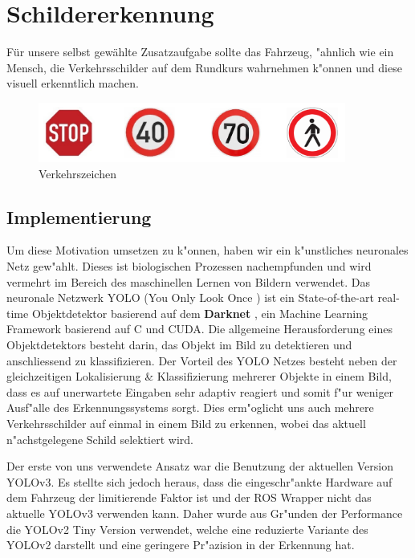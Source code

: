 \section{Schildererkennung}
\label{sec:schildererkennung}

F\"ur unsere selbst gew\"ahlte Zusatzaufgabe sollte das Fahrzeug, "ahnlich wie ein Mensch, die Verkehrsschilder auf dem Rundkurs wahrnehmen k"onnen und diese visuell erkenntlich machen.

\begin{figure}[h]
	\centering
	\includegraphics[width=0.9\textwidth]{images/Verkehrszeichen}
	\caption{Verkehrszeichen}
	\label{fig:verkehrszeichen}
\end{figure}

\subsection{Implementierung}
Um diese Motivation umsetzen zu k"onnen, haben wir ein k"unstliches neuronales Netz gew"ahlt. Dieses ist biologischen Prozessen nachempfunden und wird vermehrt im Bereich des maschinellen Lernen von Bildern verwendet. Das neuronale Netzwerk YOLO (You Only Look Once \cite{darknet13}) ist ein State-of-the-art real-time Objektdetektor
basierend auf dem \textbf{Darknet} , ein Machine Learning Framework basierend auf C und CUDA.
Die allgemeine Herausforderung eines Objektdetektors besteht darin, das Objekt im Bild zu detektieren und anschliessend zu klassifizieren. Der Vorteil des YOLO Netzes besteht neben der gleichzeitigen Lokalisierung \& Klassifizierung mehrerer Objekte in einem Bild, dass es auf unerwartete Eingaben sehr adaptiv reagiert und somit f"ur weniger Ausf"alle des Erkennungssystems sorgt. Dies erm"oglicht uns auch mehrere Verkehrsschilder auf einmal in einem Bild zu erkennen, wobei das aktuell n"achstgelegene Schild selektiert wird.

Der erste von uns verwendete Ansatz war die Benutzung der aktuellen Version YOLOv3. Es stellte sich jedoch heraus, dass die eingeschr"ankte Hardware auf dem Fahrzeug der limitierende Faktor ist und der ROS Wrapper nicht das aktuelle YOLOv3 verwenden kann. Daher wurde aus Gr"unden der Performance die YOLOv2 Tiny Version verwendet, welche eine reduzierte Variante des YOLOv2 darstellt und eine geringere Pr"azision in der Erkennung hat.

